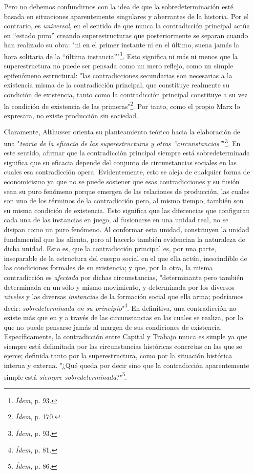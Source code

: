 \documentclass{book}
\begin{document}
Pero no debemos confundirnos con la idea de que la sobredeterminación
esté basada en situaciones aparentemente singulares y aberrantes de la
historia. Por el contrario, es \emph{universal}, en el sentido de que
nunca la contradicción principal actúa en ``estado puro'' creando
superestructuras que posteriormente se separan cuando han realizado su
obra: "ni en el primer instante ni en el último, suena jamás la hora
solitaria de la ``última instancia''"\footnote{\emph{Ídem}, p. 93.}.
Esto significa ni más ni menos que la superestructura no puede ser
pensada como un mero reflejo, como un simple epifenómeno estructural:
"las contradicciones secundarias son necesarias a la existencia misma de
la contradicción principal, que constituye realmente su condición de
existencia, tanto como la contradicción principal constituye a su vez la
condición de existencia de las primeras"\footnote{\emph{Ídem}, p. 170.}.
Por tanto, como el propio Marx lo expresara, no existe producción sin
sociedad.

Claramente, Althusser orienta su planteamiento teórico hacia la
elaboración de una "\emph{teoría de la eficacia de las superestructuras
y otras ``circunstancias''}"\footnote{\emph{Ídem}, p. 93.}. En este
sentido, afirmar que la contradicción principal siempre está
sobredeterminada significa que su eficacia depende del conjunto de
circunstancias sociales en las cuales esa contradicción opera.
Evidentemente, esto se aleja de cualquier forma de economicismo ya que
no se puede sostener que esas contradicciones y su fusión sean su puro
fenómeno porque emergen de las relaciones de producción, las cuales son
uno de los términos de la contradicción pero, al mismo tiempo, también
son su misma condición de existencia. Esto significa que las diferencias
que configuran cada una de las instancias en juego, al fusionarse en una
unidad real, no se disipan como un puro fenómeno. Al conformar esta
unidad\emph{,} constituyen la unidad fundamental que las alienta, pero
al hacerlo también evidencian la naturaleza de dicha unidad. Esto es,
que la contradicción principal es, por una parte, inseparable de la
estructura del cuerpo social en el que ella actúa, inescindible de las
condiciones formales de su existencia; y que, por la otra, la misma
contradicción es \emph{afectada} por dichas circunstancias,
"determinante pero también determinada en un sólo y mismo movimiento, y
determinada por los diversos \emph{niveles} y las diversas
\emph{instancias} de la formación social que ella arma; podríamos decir:
\emph{sobredeterminada en su principio}"\footnote{\emph{Ídem}, p.
  81\emph{.}}. En definitiva, una contradicción no existe más que en y a
través de las circunstancias en las cuales se realiza, por lo que no
puede pensarse jamás al margen de sus condiciones de existencia.
Específicamente, la contradicción entre Capital y Trabajo nunca es
simple ya que siempre está delimitada por las circunstancias históricas
concretas en las que se ejerce; definida tanto por la superestructura,
como por la situación histórica interna y externa. "¿Qué queda por decir
sino que la contradicción aparentemente simple está \emph{siempre
sobredeterminada}?"\footnote{\emph{Ídem}, p. 86.}.
\end{document}
